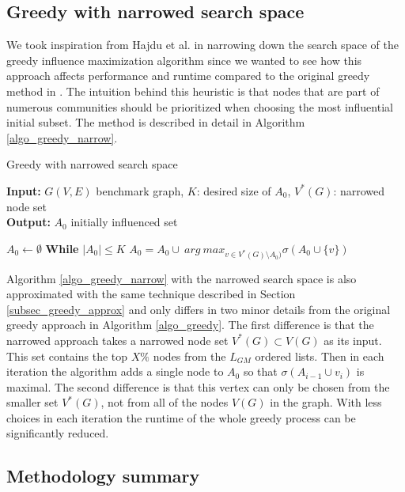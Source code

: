 \documentclass[pdflatex,sn-mathphys-num]{sn-jnl}
\begin{document}
\subsection{Greedy with narrowed search space}\label{subsec_narrowed}

We took inspiration from Hajdu et al. \cite{evaluating} in narrowing down the search space of the greedy influence maximization algorithm since we wanted to see how this approach affects performance and runtime compared to the original greedy method in \cite{kempe}. The intuition behind this heuristic is that nodes that are part of numerous communities should be prioritized when choosing the most influential initial subset. The method is described in detail in Algorithm \ref{algo_greedy_narrow}.

\begin{algorithm}[ht]
\caption{Greedy with narrowed search space}
\label{algo_greedy_narrow}
\textbf{Input:} $G(V,E)$ benchmark graph, $K$: desired size of $A_0$, $V^*(G)$: narrowed node set
\\
\textbf{Output:} $A_{0}$ initially influenced set
\begin{algorithmic}[1]
    \State $A_0 \leftarrow \emptyset$
    \State \textbf{While} $|A_{0}| \leq K$
    \State \hspace{\algorithmicindent} $A_{0}=A_{0} \cup \ arg \ max_{v \in V^*(G) \setminus A_{0})} \sigma(A_{0} \cup \{v\})$
\end{algorithmic}
\end{algorithm}

Algorithm \ref{algo_greedy_narrow} with the narrowed search space is also approximated with the same technique described in Section \ref{subsec_greedy_approx} and only differs in two minor details from the original greedy approach in Algorithm \ref{algo_greedy}. The first difference is that the narrowed approach takes a narrowed node set $V^*(G) \subset V(G)$ as its input. This set contains the top $X\%$ nodes from the $L_{GM}$ ordered lists. Then in each iteration the algorithm adds a single node to $A_{0}$ so that $\sigma(A_{i-1} \cup {v_i})$ is maximal. The second difference is that this vertex can only be chosen from the smaller set $V^*(G)$, not from all of the nodes $V(G)$ in the graph. With less choices in each iteration the runtime of the whole greedy process can be significantly reduced.


\subsection{Methodology summary}\label{subsec_method_summ}
\end{document}
